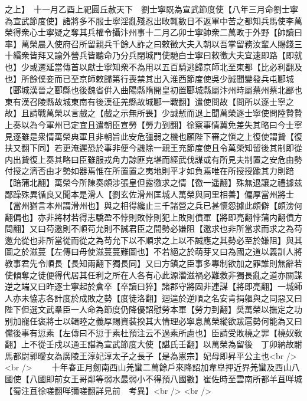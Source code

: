 之上】　十一月乙酉上祀圓丘赦天下　劉士寧既為宣武節度使【八年三月命劉士寧為宣武節度使】諸將多不服士寧淫亂殘忍出畋輒數日不返軍中苦之都知兵馬使李萬榮得衆心士寧疑之奪其兵權令攝汴州事十二月乙卯士寧帥衆二萬畋于外野【帥讀曰率】萬榮晨入使府召所留親兵千餘人詐之曰敕徵大夫入朝以吾掌留務汝輩人賜錢三十緡衆皆拜又諭外營兵皆聽命乃分兵閉城門使馳白士寧曰敕徵大夫宜速即路【即就也】少或遷延當傳首以獻士寧知衆不為用以五百騎逃歸京師北至東都【比必利翻及也】所餘僕妾而已至京師敕歸第行喪禁其出入淮西節度使吳少誠聞變發兵屯郾城【郾城漢晉之郾縣也後魏省倂入曲陽縣隋開皇初置郾城縣屬汴州時屬蔡州蔡北鄙也東有漢召陵縣故城東南有後漢征羌縣故城郾一戰翻】遣使問故【問所以逐士寧之故】且請戰萬榮以言戲之【戲之示無所畏】少誠慙而退上聞萬榮逐士寧使問陸贄贄上奏以為今軍州已定宜且遣朝臣宣勞【勞力到翻】徐察事情冀免差失其略曰今士寧見逐雖是衆情萬榮典軍且非朝旨此安危彊弱之機也願陛下審之愼之上復使謂贄【復扶又翻下同】若更淹遲恐於事非便今譏除一親王充節度使且令萬榮知留後其制即從内出贄復上奏其略曰臣雖服戎角力諒匪克堪而經武伐謀或有所見夫制置之安危由勢付授之濟否由才勢如器焉惟在所置置之夷地則平才如負焉唯在所授授踰其力則踣【踣蒲北翻】萬榮今所陳奏頗涉張皇但露徼求之情【徼一遥翻】殊無退讓之禮據兹鄙躁殊異循良又聞本是滑人【劉玄佐滑州匡城人萬榮與同里相善】偏厚當州將士【當州猶言本州謂滑州也】與之相得纔止三千諸營之兵已甚懷怨據此頗僻【頗滂何翻偏也】亦非將材若得志驕盈不悖則敗悖則犯上敗則僨軍【將即亮翻悖蒲内翻僨方問翻】又曰苟邀則不順苟允則不誠君臣之間勢必嫌阻【邀求也非所當求而求之為苟邀允從也非所當從而從之為苟允下以不順求之上以不誠應之其勢必至於嫌阻】與其圖之於滋蔓【左傳曰毋使滋蔓蔓難圖也】不若絕之於萌芽又曰為國之道以義訓人將教事君先令順長【長知兩翻下獨長同】又曰方鎮之臣事多專制欲加之罪誰則無辭若使傾奪之徒便得代居其任利之所在人各有心此源濳滋禍必難救非獨長亂之道亦關謀逆之端又曰昨逐士寧起於倉卒【卒讀曰猝】諸郡守將固非連謀【將即亮翻】一城師人亦未恊志各計度於成敗之勢【度徒洛翻】迴遑於逆順之名安肯捐軀與之同惡又曰陛下但選文武羣臣一人命為節度仍降優詔慰勞本軍【勞力到翻】奨萬榮以撫定之功别加寵任褒將士以輯睦之義厚賜資装揆其大情理必寧息萬榮縱欲跋扈勢何能為又曰儻後事有愆素【左傳曰不愆于素杜預注云不過素所慮也】臣請受敗橈之罪【橈奴敎翻】上不從壬戍以通王諶為宣武節度大使【諶氏壬翻】以萬榮為留後　丁卯納故駙馬都尉郭曖女為廣陵王淳妃淳太子之長子【是為憲宗】妃母即昇平公主也<br />
<br />
　　十年春正月劒南西山羌蠻二萬餘戶來降詔加韋臯押近界羌蠻及西山八國使【八國即前女王哥鄰等弱水最弱小不得預八國數】崔佐時至雲南所都羊苴咩城【蜀注苴徐嗟翻咩彌嗟翻詳見前　考異】<br />
<br />
